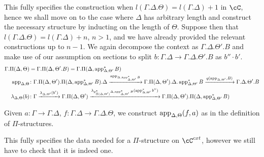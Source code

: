 \begin{construction}
  This fully specifies the construction when
  $l(\Gamma.\Delta.\Theta)=l(\Gamma.\Delta)+1$ in $\cC$, hence we shall move on
  to the case where $\Delta$ has arbitrary length and construct the necessary
  structure by inducting on the length of $\Theta$. Suppose then that
  $l(\Gamma.\Delta.\Theta)=l(\Gamma.\Delta)+n$, $n>1$, and we have already
  provided the relevant constructions up to $n-1$. We again decompose
  the context as $\Gamma.\Delta.\Theta'.B$ and make use of our assumption on
  sections to split $b\colon\Gamma.\Delta\rightarrow\Gamma.\Delta.\Theta'.B$ as
  $b''\cdot b'$.
  \begin{align*}
    \Gamma.\Pi(\Delta,\Theta)
    &=\Gamma.\Pi(\Delta,\Theta'.B)=\Gamma.\Pi(\Delta,\operatorname{app}^*_{\Delta,\Theta'}B) \\
    \operatorname{app}_{\Delta,\Theta}
    &\colon\Gamma.\Pi(\Delta,\Theta').\Pi(\Delta,\operatorname{app}^*_{\Delta,\Theta'}B).\Delta
    \xrightarrow{\operatorname{app}_{\Delta,\operatorname{app}^*_{\Delta,\Theta'}B}}
    \Gamma.\Pi(\Delta,\Theta').\Delta.\operatorname{app}^*_{\Delta,\Theta'}B
    \xrightarrow{q(\operatorname{app}_{\Delta,\Theta'},B)}
    \Gamma.\Delta.\Theta'.B \\
    \lambda_{\Delta,\Theta}(b)
    &\colon\Gamma
    \xrightarrow{\lambda_{\Delta,\Theta'}(b')}
    \Gamma.\Pi(\Delta,\Theta')
    \xrightarrow{\lambda_{p^*_{\Pi(\Delta,\Theta')}\Delta,\operatorname{app}^*_{\Delta,\Theta'}B}(\operatorname{app}_{\Delta,\Theta'}^*b'')}
    \Gamma.\Pi(\Delta,\Theta').\Pi(\Delta,\operatorname{app}^*_{\Delta,\Theta'}B)
  \end{align*}

  Given $a\colon\Gamma\rightarrow\Gamma.\Delta$,
  $f\colon\Gamma.\Delta\rightarrow\Gamma.\Delta.\Theta$, we construct
  $\operatorname{app}_{\Delta,\Theta}(f,a)$ as in the definition of $\Pi$-structures.

  This fully specifies the data needed for a $\Pi$-structure on $\cC^{cxt}$,
  however we still have to check that it is indeed one.
\end{construction}

